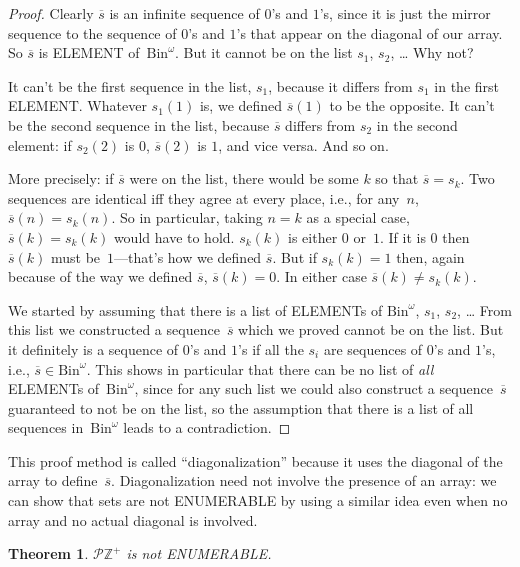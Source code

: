 \documentclass[10pt,a4paper]{article}
\newcommand*{\olup}[1]{\MakeUppercase{#1}}
\theoremstyle{plain}
\newtheorem{thm}{Theorem}[section]
\theoremstyle{definition}
\theoremstyle{remark}
\newenvironment{explain}{}{}
\newcommand*{\ollabel}[1]{\label{#1}}
\providecommand{\PosInt}{\mathbb{Z}^{+}}
\providecommand{\Bin}{\mathrm{Bin}}
\providecommand{\Pow}{\mathcal{P}}
\begin{document}
\begin{proof}
Clearly $\overline{s}$ is an infinite sequence of $0$'s and
$1$'s, since it is just the mirror sequence to the sequence of $0$'s
and $1$'s that appear on the diagonal of our array.  So $\overline{s}$
is \olup{element} of~$\Bin^\omega$.  But it cannot be on the list $s_1$,
$s_2$, \dots{} Why not?

It can't be the first sequence in the list, $s_1$, because it differs from
$s_1$ in the first \olup{element}.  Whatever $s_1(1)$ is, we defined
$\overline{s}(1)$ to be the opposite.  It can't be the second
sequence in the list, because $\overline{s}$ differs from $s_2$ in the second
element: if $s_2(2)$ is $0$, $\overline{s}(2)$ is $1$, and vice
versa. And so on.

More precisely: if $\overline{s}$ were on the list, there would be
some $k$ so that $\overline{s} = s_{k}$.  Two sequences are identical
iff they agree at every place, i.e., for any~$n$, $\overline{s}(n) =
s_{k}(n)$.  So in particular, taking $n = k$ as a special case,
$\overline{s}(k) = s_{k}(k)$ would have to hold. $s_k(k)$ is either
$0$ or~$1$. If it is $0$ then $\overline{s}(k)$ must be~$1$---that's
how we defined $\overline{s}$. But if $s_k(k) = 1$ then, again because
of the way we defined $\overline{s}$, $\overline{s}(k) = 0$. In either
case $\overline{s}(k) \neq s_{k}(k)$.

We started by assuming that there is a list of \olup{element}s of
$\Bin^\omega$, $s_1$, $s_2$, \dots{} From this list we constructed a
sequence~$\overline{s}$ which we proved cannot be on the list.  But it
definitely is a sequence of $0$'s and $1$'s if all the $s_i$ are
sequences of $0$'s and $1$'s, i.e., $\overline{s} \in
\Bin^\omega$. This shows in particular that there can be no list of
\emph{all} \olup{element}s of~$\Bin^\omega$, since for any such list we
could also construct a sequence~$\overline{s}$ guaranteed to not be on
the list, so the assumption that there is a list of all sequences
in~$\Bin^\omega$ leads to a contradiction.
\end{proof}

\begin{explain}
This proof method is called ``diagonalization'' because it uses the
diagonal of the array to define~$\overline{s}$. Diagonalization need
not involve the presence of an array: we can show that sets are not
\olup{enumerable} by using a similar idea even when no array and no
actual diagonal is involved.
\end{explain}

\begin{thm}
\ollabel{thm:nonenum-pownat}
$\Pow{\PosInt}$ is not \olup{enumerable}.
\end{thm}
\end{document}
